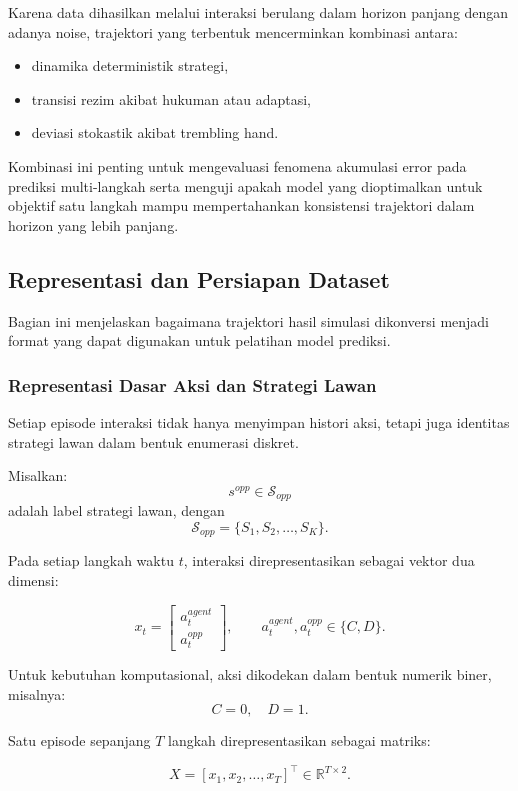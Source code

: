 Karena data dihasilkan melalui interaksi berulang dalam horizon panjang dengan adanya noise, trajektori yang terbentuk mencerminkan kombinasi antara:
\begin{itemize}
    \item dinamika deterministik strategi,
    \item transisi rezim akibat hukuman atau adaptasi,
    \item deviasi stokastik akibat trembling hand.
\end{itemize}

Kombinasi ini penting untuk mengevaluasi fenomena akumulasi error pada prediksi multi-langkah serta menguji apakah model yang dioptimalkan untuk objektif satu langkah mampu mempertahankan konsistensi trajektori dalam horizon yang lebih panjang.

\subsection{Representasi dan Persiapan Dataset}

Bagian ini menjelaskan bagaimana trajektori hasil simulasi dikonversi menjadi format yang dapat digunakan untuk pelatihan model prediksi.

\subsubsection{Representasi Dasar Aksi dan Strategi Lawan}

Setiap episode interaksi tidak hanya menyimpan histori aksi, tetapi juga identitas strategi lawan dalam bentuk enumerasi diskret.

Misalkan:
\[
s^{opp} \in \mathcal{S}_{opp}
\]
adalah label strategi lawan, dengan
\[
\mathcal{S}_{opp} = \{S_1, S_2, \dots, S_K\}.
\]

Pada setiap langkah waktu $t$, interaksi direpresentasikan sebagai vektor dua dimensi:

\[
x_t =
\begin{bmatrix}
a_t^{agent} \\
a_t^{opp}
\end{bmatrix},
\qquad
a_t^{agent}, a_t^{opp} \in \{C, D\}.
\]

Untuk kebutuhan komputasional, aksi dikodekan dalam bentuk numerik biner, misalnya:
\[
C = 0, 
\quad 
D = 1.
\]

Satu episode sepanjang $T$ langkah direpresentasikan sebagai matriks:

\[
X = [x_1, x_2, \dots, x_T]^\top \in \mathbb{R}^{T \times 2}.
\]

